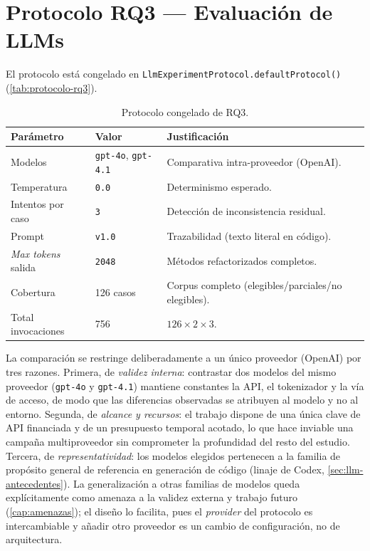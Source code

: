 \section{Protocolo RQ3 — Evaluación de LLMs}
\label{sec:exp-rq3}
El protocolo está congelado en
\lstinline|LlmExperimentProtocol.defaultProtocol()|
(\autoref{tab:protocolo-rq3}).

\begin{table}[ht]
\centering
\caption{Protocolo congelado de RQ3.}
\label{tab:protocolo-rq3}
\begin{tabular}{@{}lll@{}}
\toprule
\textbf{Parámetro} & \textbf{Valor} & \textbf{Justificación} \\
\midrule
Modelos & \texttt{gpt-4o}, \texttt{gpt-4.1} & Comparativa intra-proveedor (OpenAI). \\
Temperatura & \texttt{0.0} & Determinismo esperado. \\
Intentos por caso & \texttt{3} & Detección de inconsistencia residual. \\
Prompt & \texttt{v1.0} & Trazabilidad (texto literal en código). \\
\emph{Max tokens} salida & \texttt{2048} & Métodos refactorizados completos. \\
Cobertura & 126 casos & Corpus completo (elegibles/parciales/no elegibles). \\
Total invocaciones & 756 & $126 \times 2 \times 3$. \\
\bottomrule
\end{tabular}
\end{table}

La comparación se restringe deliberadamente a un único proveedor (OpenAI) por
tres razones. Primera, de \emph{validez interna}: contrastar dos modelos del
mismo proveedor (\texttt{gpt-4o} y \texttt{gpt-4.1}) mantiene constantes la
API, el tokenizador y la vía de acceso, de modo que las diferencias observadas
se atribuyen al modelo y no al entorno. Segunda, de \emph{alcance y recursos}:
el trabajo dispone de una única clave de API financiada y de un presupuesto
temporal acotado, lo que hace inviable una campaña multiproveedor sin
comprometer la profundidad del resto del estudio. Tercera, de
\emph{representatividad}: los modelos elegidos pertenecen a la familia de
propósito general de referencia en generación de código (linaje de Codex,
\autoref{sec:llm-antecedentes}). La generalización a otras familias de modelos
queda explícitamente como amenaza a la validez externa y trabajo futuro
(\autoref{cap:amenazas}); el diseño lo facilita, pues el \emph{provider} del
protocolo es intercambiable y añadir otro proveedor es un cambio de
configuración, no de arquitectura.

